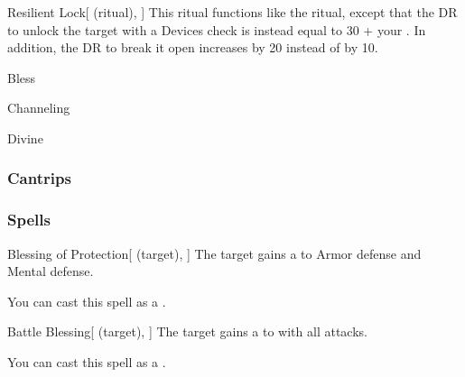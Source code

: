 \lowercase{\hypertarget{spell:Resilient Lock}{}}\label{spell:Resilient Lock}
\begin{attuneability}[\nth{4}]{\hypertarget{spell:Resilient Lock}{Resilient Lock}}[ (ritual), ]
This ritual functions like the  ritual, except that the DR to unlock the target with a Devices check is instead equal to 30 + your .
In addition, the DR to break it open increases by 20 instead of by 10.
\end{attuneability}
\vspace{0.25em}


\newpage
\begin{spellsection}{Bless}

\begin{spellheader}
\end{spellheader}


 Channeling

 Divine

\subsubsection{Cantrips}


\end{spellsection}


\subsubsection{Spells}


\lowercase{\hypertarget{spell:Blessing of Protection}{}}\label{spell:Blessing of Protection}
\begin{attuneability}[\nth{1}]{\hypertarget{spell:Blessing of Protection}{Blessing of Protection}}[ (target), ]
The target gains a   to Armor defense and Mental defense.

You can cast this spell as a .
\end{attuneability}
\vspace{0.25em}



\lowercase{\hypertarget{spell:Battle Blessing}{}}\label{spell:Battle Blessing}
\begin{attuneability}[\nth{2}]{\hypertarget{spell:Battle Blessing}{Battle Blessing}}[ (target), ]
The target gains a   to  with all attacks.

You can cast this spell as a .
\end{attuneability}
\vspace{0.25em}



